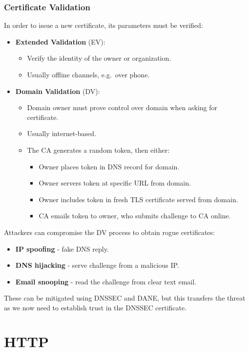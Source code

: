 \documentclass[11pt]{article}
\begin{document}
\subsubsection{Certificate Validation}
In order to issue a new certificate, its parameters must be verified:
\begin{itemize}
  \item \textbf{Extended Validation} (EV):
    \begin{itemize}
      \item Verify the identity of the owner or organization.
      \item Usually offline channels, e.g.\ over phone.
    \end{itemize}
  \item \textbf{Domain Validation} (DV):
    \begin{itemize}
      \item Domain owner must prove control over domain when asking for certificate.
      \item Usually internet-based.
      \item The CA generates a random token, then either:
        \begin{itemize}
          \item Owner places token in DNS record for domain.
          \item Owner servers token at specific URL from domain.
          \item Owner includes token in fresh TLS certificate served from domain.
          \item CA emails token to owner, who submits challenge to CA online.
        \end{itemize}
    \end{itemize}
\end{itemize}

Attackers can compromise the DV process to obtain rogue certificates:
\begin{itemize}
  \item \textbf{IP spoofing} - fake DNS reply.
  \item \textbf{DNS hijacking} - serve challenge from a malicious IP.
  \item \textbf{Email snooping} - read the challenge from clear text email.
\end{itemize}
These can be mitigated using DNSSEC and DANE, but this transfers the threat as we now need to establish trust in the DNSSEC certificate.

\section{HTTP}
\end{document}
